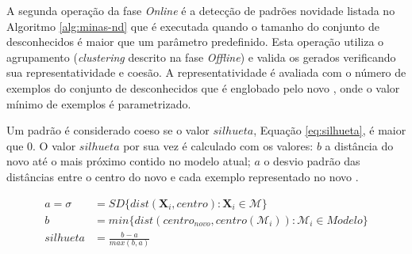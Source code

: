 A segunda operação da fase \emph{Online} é a detecção de padrões novidade
listada no Algoritmo \ref{alg:minas-nd} que é executada quando o tamanho do
conjunto de desconhecidos é maior que um parâmetro predefinido.
Esta operação utiliza o agrupamento (\emph{clustering} descrito na fase
\emph{Offline}) e valida os \mclusters gerados verificando sua
representatividade e coesão.
A representatividade é avaliada com o número de exemplos do conjunto de
desconhecidos que é englobado pelo novo \mcluster, onde o valor mínimo de
exemplos é parametrizado.

Um padrão é considerado coeso se o valor $\mathit{silhueta}$, Equação
\ref{eq:silhueta}, é maior que $0$.
O valor $\mathit{silhueta}$ por sua vez é calculado com os valores:
$b$ a distância do novo \mcluster até o mais próximo contido no modelo atual;
$a$ o desvio padrão das distâncias entre o centro do novo \mcluster e cada
exemplo representado no novo \mcluster.

\begin{align}
  a = \sigma &= \mathit{SD}\{ dist(\mathbf{X}_i, centro) : \mathbf{X}_i \in \mathcal{M} \} \nonumber\\
  b &= min\{ dist( centro_{novo}, centro(\mathcal{M}_i)) : \mathcal{M}_i \in {Modelo}\}\nonumber\\
  \mathit{silhueta} &= \frac{b - a}{max(b, a)} \label{eq:silhueta}
\end{align}


